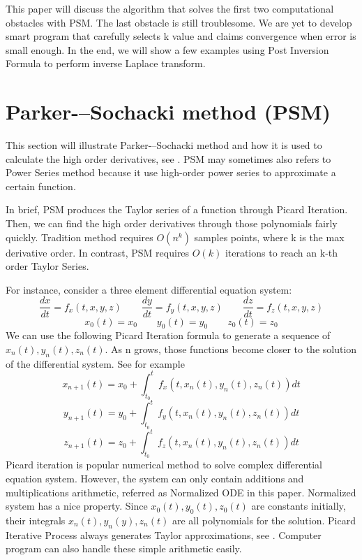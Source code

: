 \documentclass[12pt]{article}
\begin{document}
This paper will discuss the algorithm that solves the first two computational obstacles with PSM. The last obstacle is still troublesome. We are yet to develop smart program that carefully selects k value and claims convergence when error is small enough. In the end, we will show a few examples using Post Inversion Formula to perform inverse Laplace transform.

\section{Parker-–Sochacki method (PSM)}

This section will illustrate Parker-–Sochacki method and how it is used to calculate the high order derivatives, see \cite{OV}. PSM may sometimes also refers to Power Series method because it use high-order power series to approximate a certain function.

In brief, PSM produces the Taylor series of a function through Picard Iteration. Then, we can find the high order derivatives through those polynomials fairly quickly. Tradition method requires $O(n^{k})$ samples points, where k is the max derivative order. In contrast, PSM requires $O(k)$ iterations to reach an k-th order Taylor Series.

For instance, consider a three element differential equation system:
\begin{equation}
\frac{dx}{dt} = f_{x}(t, x, y, z) \qquad
\frac{dy}{dt} = f_{y}(t, x, y, z) \qquad
\frac{dz}{dt} = f_{z}(t, x, y, z)
\end{equation}	
\begin{equation}
x_{0}(t) = x_{0} \qquad
y_{0}(t) = y_{0} \qquad
z_{0}(t) = z_{0}
\end{equation}
We can use the following Picard Iteration formula to generate a sequence of $x_{n}(t),y_{n}(t),z_{n}(t)$. As n grows, those functions become closer to the solution of the differential system. See for example \cite{CL}
\begin{equation}
x_{n+1}(t) = x_{0} + \int_{t_{0}}^{t} f_{x}(t, x_{n}(t),y_{n}(t),z_{n}(t)) dt
\end{equation}
\begin{equation}
y_{n+1}(t) = y_{0} + \int_{t_{0}}^{t} f_{y}(t, x_{n}(t),y_{n}(t),z_{n}(t)) dt
\end{equation}
\begin{equation}
z_{n+1}(t) = z_{0} + \int_{t_{0}}^{t} f_{z}(t, x_{n}(t),y_{n}(t),z_{n}(t)) dt
\end{equation}
Picard iteration is popular numerical method to solve complex differential equation system. However, the system can only contain additions and multiplications arithmetic, referred as Normalized ODE in this paper.
Normalized system has a nice property. Since $x_{0}(t),y_{0}(t),z_{0}(t)$ are constants initially, their integrals $x_{n}(t),y_{n}(y),z_{n}(t)$ are all polynomials for the solution. Picard Iterative Process always generates Taylor approximations, see \cite{PS}. Computer program can also handle these simple arithmetic easily.
\end{document}
